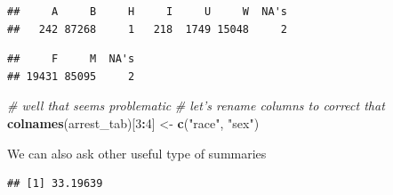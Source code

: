 \documentclass[12pt,]{book}
\newenvironment{Shaded}{\begin{snugshade}}{\end{snugshade}}
\newcommand{\KeywordTok}[1]{\textcolor[rgb]{0.13,0.29,0.53}{\textbf{#1}}}
\newcommand{\DecValTok}[1]{\textcolor[rgb]{0.00,0.00,0.81}{#1}}
\newcommand{\StringTok}[1]{\textcolor[rgb]{0.31,0.60,0.02}{#1}}
\newcommand{\CommentTok}[1]{\textcolor[rgb]{0.56,0.35,0.01}{\textit{#1}}}
\newcommand{\OperatorTok}[1]{\textcolor[rgb]{0.81,0.36,0.00}{\textbf{#1}}}
\newcommand{\NormalTok}[1]{#1}
\theoremstyle{definition}
\theoremstyle{definition}
\theoremstyle{remark}
\begin{document}
\begin{Shaded}
\end{Shaded}

\begin{verbatim}
##     A     B     H     I     U     W  NA's 
##   242 87268     1   218  1749 15048     2
\end{verbatim}

\begin{Shaded}
\end{Shaded}

\begin{verbatim}
##     F     M  NA's 
## 19431 85095     2
\end{verbatim}

\begin{Shaded}
\begin{Highlighting}[]
\CommentTok{# well that seems problematic}
\CommentTok{# let's rename columns to correct that}
\KeywordTok{colnames}\NormalTok{(arrest_tab)[}\DecValTok{3}\OperatorTok{:}\DecValTok{4}\NormalTok{] <-}\StringTok{ }\KeywordTok{c}\NormalTok{(}\StringTok{"race"}\NormalTok{, }\StringTok{"sex"}\NormalTok{)}
\end{Highlighting}
\end{Shaded}

We can also ask other useful type of summaries

\begin{Shaded}
\end{Shaded}

\begin{verbatim}
## [1] 33.19639
\end{verbatim}

\begin{Shaded}
\end{Shaded}
\end{document}
